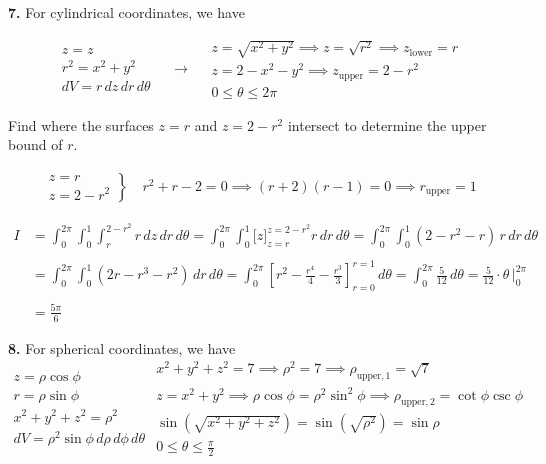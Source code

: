 \documentclass{article}
\begin{document}
\vspace{1em}

\textbf{7.} For cylindrical coordinates, we have

\[
\begin{array}{c}
z=z\\
r^2=x^2+y^2\\
dV=r\,dz\,dr\,d\theta
\end{array}\quad\rightarrow\quad
\begin{array}{c}
\displaystyle z=\sqrt{x^2+y^2}\implies z=\sqrt{r^2}\implies z_{\text{lower}}=r\\[1em]
z=2-x^2-y^2\implies z_{\text{upper}}=2-r^2\\[1em]
0\leq\theta\leq2\pi
\end{array}
\]

Find where the surfaces $z=r$ and $z=2-r^2$ intersect to determine the upper bound of $r$.

\begin{align*}\left.\begin{array}{c}
z=r\\
z=2-r^2
\end{array}\right\}\quad r^2+r-2=0\implies (r+2)(r-1)=0\implies r_{\text{upper}}=1\end{align*}

\newpage

\begin{align*}{I}&=\int_0^{2\pi}\int_0^1\int_{r}^{2-r^2}r\,dz\,dr\,d\theta=\int_0^{2\pi}\int_0^1\bigg[z\bigg]_{z=r}^{z=2-r^2}r\,dr\,d\theta=\int_0^{2\pi}\int_0^1\left(2-r^2-r\right)\,r\,dr\,d\theta\\\\&=\int_0^{2\pi}\int_0^1\left(2r-r^3-r^2\right)\,dr\,d\theta=\int_0^{2\pi}\left[r^2-\frac{r^4}4-\frac{r^3}3\right]_{r=0}^{r=1}\,d\theta=\int_0^{2\pi}\frac5{12}\,d\theta=\frac5{12}\cdot\theta\,\bigg|_0^{2\pi}\\\\&=\boxed{\frac{5\pi}6}\end{align*}

\vspace{1em}

\textbf{8.} For spherical coordinates, we have
\[
\left.\begin{array}{c}
z=\rho\cos\phi\\
r=\rho\sin\phi\\
x^2+y^2+z^2=\rho^2\\
dV=\rho^2\sin\phi\,d\rho\,d\phi\,d\theta
\end{array}\right.\begin{array}{c}
x^2+y^2+z^2=7\implies\rho^2=7\implies\rho_{\text{upper},1}=\sqrt7\\
z=x^2+y^2\implies\rho\cos\phi=\rho^2\sin^2\phi\implies\rho_{\text{upper},2}=\cot\phi\csc\phi\\[1em]
\sin\left(\sqrt{x^2+y^2+z^2}\right)=\sin\left(\sqrt{\rho^2}\right)=\sin\rho\\[1em]
\displaystyle0\leq\theta\leq\frac\pi2
\end{array}\]
\end{document}
